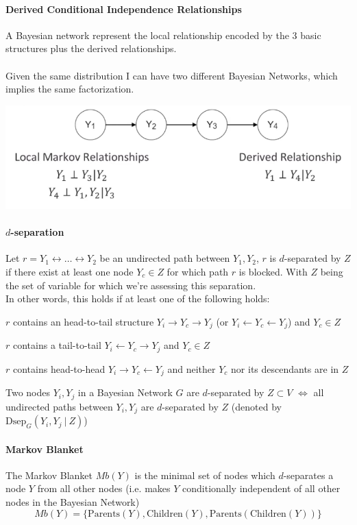\documentclass[10pt]{report}
\begin{document}
\paragraph{Derived Conditional Independence Relationships} A Bayesian network represent the local relationship encoded by the 3 basic structures plus the derived relationships.\\\\
Given the same distribution I can have two different Bayesian Networks, which implies the same factorization.
\begin{center}
	\includegraphics[scale=0.5]{23.png}
\end{center}
\paragraph{$d$-separation} Let $r = Y_1\leftrightarrow\ldots\leftrightarrow Y_2$ be an undirected path between $Y_1,Y_2$, $r$ is $d$-separated by $Z$ if there exist at least one node $Y_c\in Z$ for which path $r$ is blocked. With $Z$ being the set of variable for which we're assessing this separation.\\
In other words, this holds if at least one of the following holds:\begin{list}{}{}
	\item $r$ contains an head-to-tail structure $Y_i\rightarrow Y_c\rightarrow Y_j$ (or $Y_i\leftarrow Y_c\leftarrow Y_j$) and $Y_c \in Z$
	\item $r$ contains a tail-to-tail $Y_i\leftarrow Y_c\rightarrow Y_j$ and $Y_c \in Z$
	\item $r$ contains head-to-head $Y_i\rightarrow Y_c\leftarrow Y_j$ and neither $Y_c$ nor its descendants are in $Z$
\end{list}
Two nodes $Y_i,Y_j$ in a Bayesian Network $G$ are $d$-separated by $Z\subset V$ $\Leftrightarrow$ all undirected paths between $Y_i,Y_j$ are $d$-separated by $Z$ (denoted by $\text{Dsep}_G(Y_i,Y_j\:|\:Z)$)
\paragraph{Markov Blanket} The Markov Blanket $Mb(Y)$ is the minimal set of nodes which $d$-separates a node $Y$ from all other nodes (i.e. makes $Y$ conditionally independent of all other nodes in the Bayesian Network)
$$Mb(Y) = \{\text{Parents}(Y), \text{Children}(Y), \text{Parents}(\text{Children}(Y))\}$$
\end{document}
